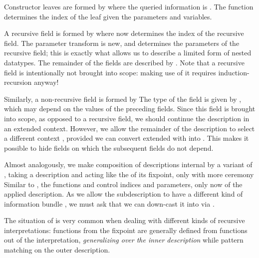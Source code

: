 Constructor leaves are formed by
where the queried information is . The function  determines the index of the leaf given the parameters and variables.

A recursive field is formed by
where  now determines the index of the recursive field. The parameter transform  is new, and determines the parameters of the recursive field; this is exactly what allows us to describe a limited form of nested datatypes. The remainder of the fields are described by . Note that a recursive field is intentionally not brought into scope: making use of it requires induction-recursion anyway!

Similarly, a non-recursive field is formed by
The type of the field is given by , which may depend on the values of the preceding fields. Since this field is brought into scope, as opposed to a recursive field, we should continue the description in an extended context. However, we allow the remainder of the description to select a different context , provided we can convert  extended with  into . This makes it possible to hide fields on which the subsequent fields do not depend.

Almost analogously, we make composition of descriptions internal by a variant of , taking a description and acting like the  of its fixpoint, only with more ceremony
Similar to , the functions  and  control indices and parameters, only now of the applied description. As we allow the subdescription  to have a different kind of information bundle , we must ask that we can down-cast it into  via .


\begin{remark}
    The situation of  is very common when dealing with different kinds of recursive interpretations: functions from the fixpoint are generally defined from functions out of the interpretation, \emph{generalizing over the inner description} while pattern matching on the outer description. 
\end{remark}

